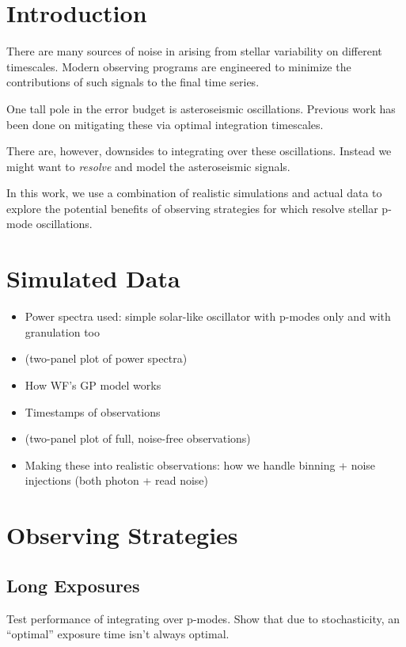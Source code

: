 \documentclass[modern]{aastex62}
\begin{document}
\section{Introduction}
\label{s:intro}

There are many sources of noise in \EPRV arising from stellar variability on different timescales. 
Modern observing programs are engineered to minimize the contributions of such signals to the final \RV time series.

One tall pole in the \EPRV error budget is asteroseismic oscillations. 
Previous work has been done on mitigating these via optimal integration timescales.

There are, however, downsides to integrating over these oscillations. 
Instead we might want to \textit{resolve} and model the asteroseismic signals.

In this work, we use a combination of realistic simulations and actual \HARPS data to explore the potential benefits of observing strategies for \EPRV which resolve stellar p-mode oscillations. 


\section{Simulated Data}

\begin{itemize}
\item Power spectra used: simple solar-like oscillator with p-modes only and with granulation too
\item (two-panel plot of power spectra)
\item How WF's GP model works
\item Timestamps of observations
\item (two-panel plot of full, noise-free observations)
\item Making these into realistic observations: how we handle binning + noise injections (both photon + read noise)
\end{itemize}

\section{Observing Strategies}

\subsection{Long Exposures}

Test performance of integrating over p-modes. Show that due to stochasticity, an ``optimal'' exposure time isn't always optimal.
\end{document}
